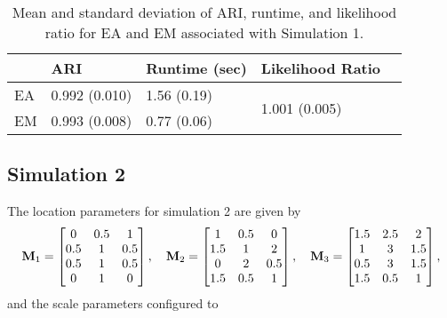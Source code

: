\documentclass[12pt, centerh1]{article}
\begin{document}
\begin{table}[!htbp]
  \caption{Mean and standard deviation of ARI, runtime, and likelihood ratio for EA and EM associated with Simulation 1.}
  \label{table:sim1}
  \begin{tabularx}{\textwidth}{l *{3}{X}c}
  \toprule
    &\textbf{ARI}& \textbf{Runtime (sec)}  & \textbf{Likelihood Ratio} \\
  \midrule
  EA & 0.992 (0.010)     & 1.56 (0.19) & \multirow{2}{*}{1.001 (0.005)}  \\
  EM & 0.993 (0.008)    & 0.77 (0.06)   \\
  \bottomrule
  \end{tabularx}
\end{table}



\subsection{Simulation 2}
The location parameters for simulation 2 are given by
$$
{\bf M}_1 =
\begin{bmatrix} 
0  &  0.5 & 1   \\
0.5 & 1 &  0.5 \\
0.5 & 1 &  0.5 \\
 0 & 1 & 0
\end{bmatrix}, \quad 
{\bf M}_2=
\begin{bmatrix} 
1 &  0.5 & 0   \\
1.5 & 1 &  2 \\
0 & 2 &  0.5 \\
 1.5 & 0.5 & 1
\end{bmatrix},
\quad 
{\bf M}_3=
\begin{bmatrix} 
1.5 &  2.5 & 2   \\
1 & 3 &  1.5 \\
0.5 & 3 &  1.5 \\
 1.5 & 0.5 & 1
\end{bmatrix},
$$
and the scale parameters configured to
\end{document}
